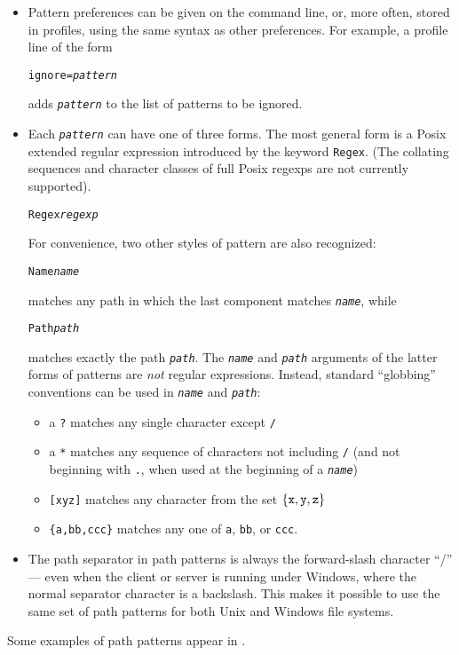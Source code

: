 \documentclass{article}
\newcommand{\ARG}[1]{\texttt{\textit{#1}}}
\begin{document}
\begin{itemize}
\item Pattern preferences can be given on the command line,
  or, more often, stored in profiles, using the same syntax as other preferences.  
  For example, a profile line of the form
\begin{alltt}
             ignore = \ARG{pattern}
\end{alltt}
adds \ARG{pattern} to the list of patterns to be ignored.

\item Each \ARG{pattern} can have one of three forms.  The most
general form is a Posix extended regular expression introduced by the
keyword \verb|Regex|.  (The collating sequences and character classes of
full Posix regexps are not currently supported).
\begin{alltt}
                 Regex \ARG{regexp}
\end{alltt}
For convenience, two other styles of pattern are also recognized:
\begin{alltt}
                 Name \ARG{name}
\end{alltt}
matches any path in which the last component matches \ARG{name}, while
\begin{alltt}
                 Path \ARG{path}
\end{alltt}
matches exactly the path \ARG{path}.
%
The \ARG{name} and \ARG{path} arguments of the latter forms of
patterns are {\em not} regular expressions.  Instead, 
standard ``globbing'' conventions can be used in \ARG{name} and
\ARG{path}:  
\begin{itemize}
\item a \verb|?| matches any single character except \verb|/|
\item a \verb|*| matches any sequence of characters not including \verb|/|
(and not beginning with \verb|.|, when used at the beginning of a
\ARG{name})
\item \verb|[xyz]| matches any character from the set $\{{\tt x},
  {\tt y}, {\tt z} \}$
\item \verb|{a,bb,ccc}| matches any one of \verb|a|, \verb|bb|, or
  \verb|ccc|. 
\end{itemize}
\item 
The path separator in path patterns is always the
forward-slash character ``/'' --- even when the client or server is
running under Windows, where the normal separator character is a
backslash.  This makes it possible to use the same set of path
patterns for both Unix and Windows file systems.  
\end{itemize}
Some examples of path patterns appear in .
\end{document}
